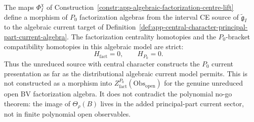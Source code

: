 \begin{thm}
\label{thm:app-algebraic-factorization-centre-zero-homotopies}
  The maps \(\Phi_I^\chi\) of
  Construction~\ref{constr:app-algebraic-factorization-centre-lift}
  define a morphism of \(P_0\) factorization algebras from the
  interval CE source of \(\widetilde{\mathfrak g}_I\) to the
  algebraic current target of
  Definition~\ref{def:app-central-character-principal-part-current-algebra}.
  The factorization centrality homotopies and the \(P_0\)-bracket
  compatibility homotopies in this algebraic model are strict:
  \[
    H_{\mathrm{fact}}=0,\qquad H_{P_0}=0 .
  \]
  Thus the unreduced source with central character constructs the
  \(P_0\) current presentation as far as the distributional algebraic
  current model permits.  This is not constructed as a morphism into
  \(Z^{P_0}_{\mathrm{fact}}(\mathrm{Obs}_{\mathrm{open}})\) for the
  genuine unreduced open BV factorization algebra.  It does not
  contradict the polynomial no-go
  theorem: the image of \(\Theta_\rho(B)\) lives in the added
  principal-part current sector, not in finite polynomial open
  observables.
\end{thm}

